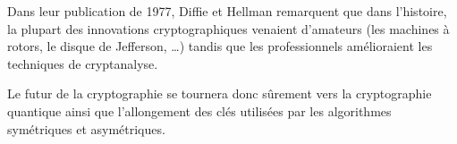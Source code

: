 Dans leur publication de 1977\cite{NewDirectionsInCryptography},
Diffie et Hellman remarquent que dans l'histoire, la plupart des
innovations cryptographiques venaient d'amateurs (les machines à
rotors, le disque de Jefferson, \dots) tandis que les professionnels
amélioraient les techniques de cryptanalyse.

Le futur de la cryptographie se tournera donc sûrement vers la
cryptographie quantique ainsi que l'allongement des clés utilisées par
les algorithmes symétriques et asymétriques.


